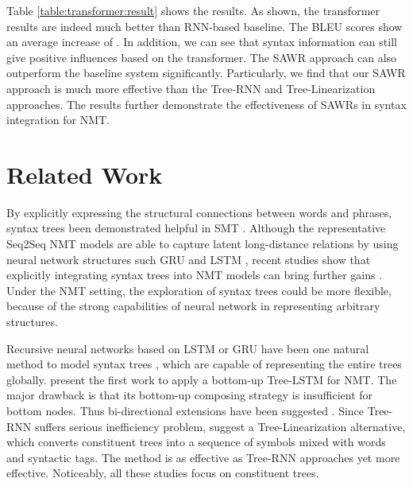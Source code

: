 \documentclass[11pt,a4paper]{article}
\begin{document}
\begin{CJK}{UTF8}{gbsn}
Table \ref{table:transformer:result} shows the results.
As shown, the transformer results are indeed much better than RNN-based baseline.
The BLEU scores show an average increase of .
In addition, we can see that syntax information can still give positive influences based on the transformer.
The SAWR approach can also outperform the baseline system significantly.
Particularly, we find that our SAWR approach is much more effective than the Tree-RNN and Tree-Linearization approaches.
The results further demonstrate the effectiveness of SAWRs in syntax integration for NMT.






\section{Related Work}
By explicitly expressing the structural connections between words and phrases,
syntax trees  been demonstrated helpful in SMT \cite{liu-liu-lin:2006:COLACL,cowan-kuucerova-collins:2006:EMNLP,marton-resnik:2008:ACLMain,xie-mi-liu:2011:EMNLP,li-resnik-daumeiii:2013:NAACL-HLT,williams2016syntax}.
Although the representative Seq2Seq NMT models are able to capture latent long-distance relations
by using neural network structures such GRU and LSTM \cite{sutskever2014sequence,wu2016google},
recent studies show that explicitly integrating syntax trees into NMT models can bring further gains \cite{sennrich-haddow:2016:WMT,shi-padhi-knight:2016:EMNLP2016,zhou-EtAl:2017:Short2,wu-EtAl:2017:Long2,aharoni-goldberg:2017:Short}.
Under the NMT setting,
the exploration of syntax trees could be more flexible,
because of the strong capabilities of neural network in representing arbitrary structures.


Recursive neural networks based on LSTM or GRU have been one natural method to model syntax trees \cite{zhu2015long,tai-socher-manning:2015:ACL-IJCNLP,li-EtAl:2015:EMNLP5,zhang-lu-lapata:2016:N16-1,teng2016bidirectional,miwa-bansal:2016:P16-1,kokkinos-potamianos:2017:EACLshort},
which are capable of representing the entire trees globally.
 present the first work to apply a bottom-up Tree-LSTM for NMT.
The major drawback is that its bottom-up composing strategy is insufficient for bottom nodes.
Thus bi-directional extensions have been suggested \cite{chen-EtAl:2017:Long6,yang-EtAl:2017:EMNLP20172}.
Since Tree-RNN suffers serious inefficiency problem,
 suggest a Tree-Linearization alternative,
which converts constituent trees into a sequence of symbols mixed with words and syntactic tags.
The method is as effective as Tree-RNN approaches yet more effective.
Noticeably, all these studies focus on constituent trees.



\end{CJK}
\end{document}
